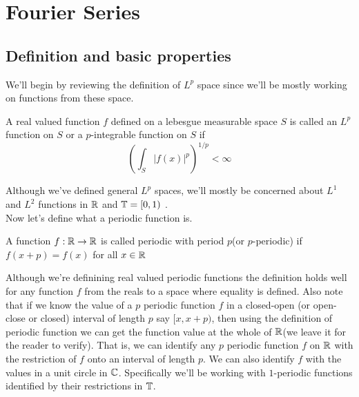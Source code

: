 \section{Fourier Series}

  \subsection{Definition and basic properties}

    We'll begin by reviewing the definition of $L^p$ space since we'll be mostly working on functions from these space.
  \begin{definition}[$L^p$ function]
    \label{Lp_function}
    A real valued function $f$ defined on a lebesgue measurable space $S$ is called an $L^p$ function on $S$ or a $p$-integrable function on $S$ if 
    \begin{displaymath}
       \left( \int_{S} |f(x)|^p \right)^{1/p} < \infty
    \end{displaymath}
\end{definition}  
  Although we've defined general $L^p$ spaces, we'll mostly be concerned about $L^1$ and $L^2$ functions in $\mathbb R$ and $\mathbb T = [0, 1)$ .
  \\

  Now let's define what a periodic function is.
  \begin{definition}
    \label{def:periodic_function}
    A function $f:\mathbb R \to \mathbb R$ is called periodic with period $p$(or $p$-periodic) if $f(x+p) = f(x)$ for all $x \in \mathbb R$

  \end{definition}
  Although we're definining real valued periodic functions the definition holds well for any function $f$ from the reals to a space where equality is defined.
  Also note that if we know the value of a $p$ periodic function $f$ in a closed-open (or open-close or closed) interval of length $p$ say $[x, x+p)$, then using the definition of periodic function we can get the function value at the whole of $\mathbb R$(we leave it for the reader to verify). That is, we can identify any $p$ periodic function $f$ on $\mathbb R$ with the restriction of $f$ onto an interval of length $p$. We can also identify $f$ with the values in a unit circle in $\mathbb C$.
  Specifically we'll be working with $1$-periodic functions identified by their restrictions in $\mathbb T$.
\\

